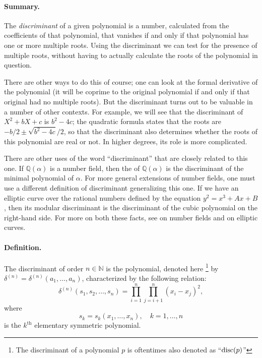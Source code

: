 \documentclass[12pt]{article}
\newcommand{\dn}{\delta^{(n)}}
\newcommand{\natnums}{\mathbb{N}}
\newcommand{\supth}{^{\text{th}}}
\begin{document}
\paragraph{Summary.}
The \emph{discriminant} of a given polynomial is a number, calculated
from the coefficients of that polynomial, that vanishes if and only if
that polynomial has one or more multiple roots.  Using the
discriminant we can test for the presence of multiple roots, without
having to actually calculate the roots of the polynomial in question.  

There are other ways to do this of course; one can look at the formal derivative of the polynomial (it will be coprime to the original polynomial if and only if that original had no multiple roots).  But the discriminant turns out to be valuable in a number of other contexts.  For example, we will see that the discriminant of $X^2+bX+c$ is $b^2-4c$; the quadratic formula states that the roots are $-b/2 \pm \sqrt{b^2-4c}/2$, so that the discriminant also determines whether the roots of this polynomial are real or not.  In higher degrees, its role is more complicated.  

There are other uses of the word ``discriminant'' that are closely related to this one.
If $\mathbb{Q}(\alpha)$ is a number field, then the  of $\mathbb{Q}(\alpha)$ is the discriminant of the minimal polynomial of $\alpha$.  For more general extensions of number fields, one must use a different definition of discriminant generalizing this one. If we have an elliptic curve over the rational numbers defined by the equation $y^2 = x^3 + Ax +B$, then its modular discriminant is the discriminant of the cubic polynomial on the right-hand side.  For more on both these facts, see \cite{marcus} on number fields and \cite{silv} on elliptic curves.

\paragraph{Definition.}
The discriminant of order $n\in\natnums$ is the polynomial, denoted
here \footnote{ The discriminant of a polynomial $p$ is oftentimes
also denoted as ``$\mathop{\rm disc} (p)$''}
by $\dn = \dn(a_1,\ldots,a_n)$, characterized by the following
relation:
\begin{equation}
\dn(s_1,s_2,\ldots,s_n) =
\prod_{i=1}^n \prod_{j=i+1}^n (x_i-x_j)^2,  
\end{equation}
where 
\[
s_k= s_k(x_1,\ldots,x_n),\quad k=1,\ldots,n
\]
is the
$k\supth$ elementary symmetric polynomial.  
\end{document}
